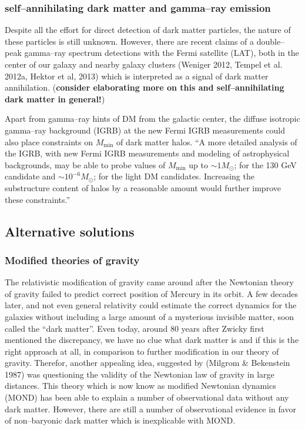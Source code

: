 \documentclass[paper=a4, fontsize=11pt]{scrartcl} %
\numberwithin{equation}{section} %
\numberwithin{figure}{section} %
\numberwithin{table}{section} %
\begin{document}
\subsubsection{self--annihilating dark matter and gamma--ray emission}
Despite all the effort for direct detection of dark matter particles, the nature of these particles is still unknown. However, there are recent claims of a double--peak gamma--ray spectrum detections with the Fermi satellite (LAT), both in the center of our galaxy and nearby galaxy clusters (Weniger 2012, Tempel et al. 2012a, Hektor et al, 2013) which is interpreted as a signal of dark matter annihilation. ({\bf consider elaborating more on this and self--annihilating dark matter in general!})

Apart from gamma--ray hints of DM from the galactic center, the diffuse isotropic gamma--ray background (IGRB) at the new Fermi IGRB measurements could also place constraints on $M_\mathrm{min}$ of dark matter halos. ``A more detailed analysis of the IGRB, with new Fermi IGRB measurements and modeling of astrophysical backgrounds, may be able to probe values of $M_\mathrm{min}$ up to $\sim 1 M_\odot$; for the 130 GeV candidate and $\sim 10^{-6} M_\odot$; for the light DM candidates. Increasing the substructure content of halos by a reasonable amount would further improve these constraints.'' %

\subsection{Alternative solutions}
\subsubsection{Modified theories of gravity}
The relativistic modification of gravity came around after the Newtonian theory of gravity failed to predict correct position of Mercury in its orbit. A few decades later, and not even general relativity could estimate the correct dynamics for the galaxies without including a large amount of a mysterious invisible matter, soon called the ``dark matter''. Even today, around 80 years after Zwicky first mentioned the discrepancy, we have no clue what dark matter is and if this is the right approach at all, in comparison to further modification in our theory of gravity. 
Therefor, another appealing idea, suggested by (Milgrom \& Bekenstein 1987) was questioning the validity of the Newtonian law of gravity in large distances. This theory which is now know as modified Newtonian dynamics (MOND) has been able to explain a number of observational data without any dark matter. However, there are still a number of observational evidence in favor of non--baryonic dark matter which is inexplicable with MOND. 



\end{document}
